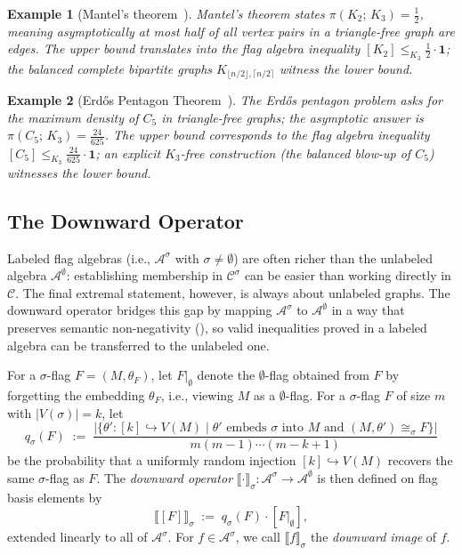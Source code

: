 \documentclass[acmsmall,screen=true,acmthm=false]{acmart}
\newtheorem{example}[example]{Example}
\newcommand{\tdensity}[2]{\pi(#1;\,#2)}
\begin{document}
\begin{example}[Mantel's theorem~\cite{mantel}]\label{ex:mantel}
  Mantel's theorem states $\tdensity{K_2}{K_3} = \tfrac{1}{2}$, meaning
  asymptotically at most half of all vertex pairs in a triangle-free graph
  are edges.  The upper bound translates into the flag algebra inequality
  $[K_2] \leq_{K_3} \tfrac{1}{2}\cdot\mathbf{1}$; the balanced complete bipartite
  graphs $K_{\lfloor n/2\rfloor,\lceil n/2\rceil}$ witness the lower bound.
\end{example}

\begin{example}[Erd\H{o}s Pentagon Theorem~{\cite{grzesik2012,hatami2012}}]\label{ex:pentagon}
  The Erd\H{o}s pentagon problem asks for the maximum density of $C_5$ in
  triangle-free graphs; the asymptotic answer is $\tdensity{C_5}{K_3} = \tfrac{24}{625}$.  The upper bound corresponds to the flag algebra inequality
  $[C_5] \leq_{K_3} \tfrac{24}{625}\cdot\mathbf{1}$; an explicit \(K_3\)-free construction
  (the balanced blow-up of $C_5$) witnesses the lower bound.
\end{example}

\subsection{The Downward Operator}
\label{sec:background-downward}
Labeled flag algebras (i.e., $\mathcal{A}^\sigma$ with $\sigma \neq \emptyset$) are often
richer than the unlabeled algebra $\mathcal{A}^\emptyset$: establishing membership
in $\mathcal{C}^\sigma$ can be easier than working directly in $\mathcal{C}$.
The final extremal statement, however, is always about unlabeled graphs.
The downward operator bridges this gap by mapping $\mathcal{A}^\sigma$ to
$\mathcal{A}^\emptyset$ in a way that preserves semantic non-negativity
(), so valid inequalities proved in a labeled algebra
can be transferred to the unlabeled one.

For a $\sigma$-flag $F = (M, \theta_F)$, let $F|_\emptyset$ denote the
$\emptyset$-flag obtained from $F$ by forgetting the embedding $\theta_F$,
i.e., viewing $M$ as a $\emptyset$-flag.
For a $\sigma$-flag $F$ of size $m$ with $|V(\sigma)|=k$, let
\[
  q_\sigma(F)
  \;:=\;
  \frac{
    \bigl|\{\theta' : [k]\hookrightarrow V(M)
       \mid \theta' \text{ embeds }\sigma\text{ into }M
       \text{ and } (M,\theta')\cong_\sigma F\}\bigr|}
       {m(m-1)\cdots(m-k+1)}
\]
be the probability that a uniformly random injection $[k]\hookrightarrow V(M)$
recovers the same $\sigma$-flag as $F$.
The \emph{downward operator}
$\llbracket\cdot\rrbracket_\sigma:\mathcal{A}^\sigma\to\mathcal{A}^\emptyset$
is then defined on flag basis elements by
\[
  \llbracket [F] \rrbracket_\sigma
  \;:=\;
  q_\sigma(F)\cdot [F|_\emptyset],
\]
extended linearly to all of $\mathcal{A}^\sigma$.
For $f\in\mathcal{A}^\sigma$, we call
$\llbracket f\rrbracket_\sigma$ the \emph{downward image} of $f$.
\end{document}
